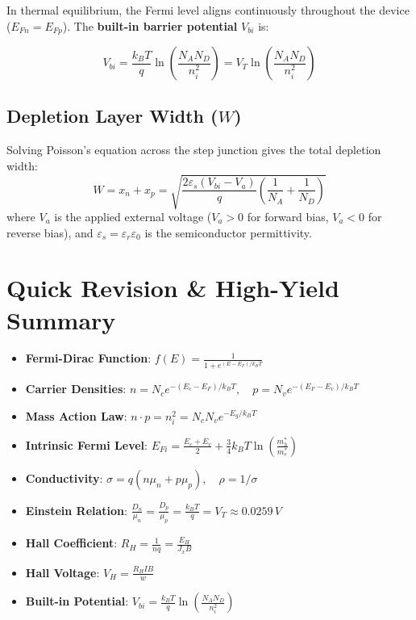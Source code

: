 In thermal equilibrium, the Fermi level aligns continuously throughout the device ($E_{Fn} = E_{Fp}$). The \textbf{built-in barrier potential} $V_{bi}$ is:

\begin{keyequation}
\begin{equation}
    V_{bi} = \frac{k_B T}{q}\ln\left(\frac{N_A N_D}{n_i^2}\right) = V_T \ln\left(\frac{N_A N_D}{n_i^2}\right)
\end{equation}
\end{keyequation}

\subsection{Depletion Layer Width (\texorpdfstring{$W$}{W})}
Solving Poisson's equation across the step junction gives the total depletion width:
\begin{equation}
    W = x_n + x_p = \sqrt{\frac{2\varepsilon_s (V_{bi} - V_a)}{q}\left(\frac{1}{N_A} + \frac{1}{N_D}\right)}
\end{equation}
where $V_a$ is the applied external voltage ($V_a > 0$ for forward bias, $V_a < 0$ for reverse bias), and $\varepsilon_s = \varepsilon_r \varepsilon_0$ is the semiconductor permittivity.

\section{Quick Revision \& High-Yield Summary}

\begin{quickrevision}
\begin{itemize}
    \item \textbf{Fermi-Dirac Function}: $f(E) = \frac{1}{1 + e^{(E-E_F)/k_B T}}$
    \item \textbf{Carrier Densities}: $n = N_c e^{-(E_c - E_F)/k_B T}, \quad p = N_v e^{-(E_F - E_v)/k_B T}$
    \item \textbf{Mass Action Law}: $n \cdot p = n_i^2 = N_c N_v e^{-E_g / k_B T}$
    \item \textbf{Intrinsic Fermi Level}: $E_{Fi} = \frac{E_c + E_v}{2} + \frac{3}{4}k_B T \ln\left(\frac{m_h^*}{m_e^*}\right)$
    \item \textbf{Conductivity}: $\sigma = q(n\mu_n + p\mu_p), \quad \rho = 1/\sigma$
    \item \textbf{Einstein Relation}: $\frac{D_n}{\mu_n} = \frac{D_p}{\mu_p} = \frac{k_B T}{q} = V_T \approx 0.0259\,\si{V}$
    \item \textbf{Hall Coefficient}: $R_H = \frac{1}{n q} = \frac{E_H}{J_x B}$
    \item \textbf{Hall Voltage}: $V_H = \frac{R_H I B}{w}$
    \item \textbf{Built-in Potential}: $V_{bi} = \frac{k_B T}{q}\ln\left(\frac{N_A N_D}{n_i^2}\right)$
\end{itemize}
\end{quickrevision}

